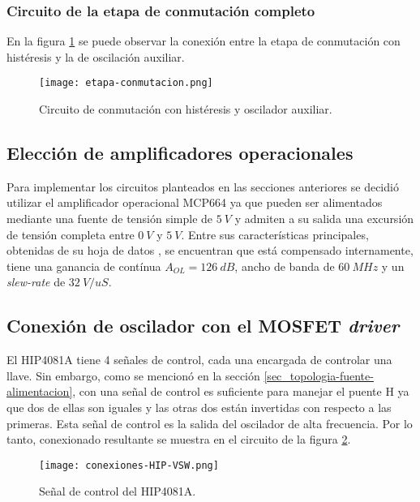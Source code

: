 \subsubsection{Circuito de la etapa de conmutación completo}

En la figura \ref{fig:img_etapa-conmutacion} se puede observar la conexión entre la etapa de conmutación con histéresis y la de oscilación auxiliar.


\begin{figure}[H]
	\centering
	\texttt{[image: etapa-conmutacion.png]}
	\caption{Circuito de conmutación con histéresis y oscilador auxiliar.}
	\label{fig:img_etapa-conmutacion}
\end{figure}

\subsection{Elección de amplificadores operacionales}

Para implementar los circuitos planteados en las secciones anteriores se decidió utilizar el amplificador operacional MCP664 ya que pueden ser alimentados mediante una fuente de tensión simple de $5\:V$ y admiten a su salida una excursión de tensión completa entre $0\:V$ y $5\:V$. Entre sus características principales, obtenidas de su hoja de datos \cite{MCP660}, se encuentran que está compensado internamente, tiene una ganancia de contínua $A_{OL}=126\:dB$, ancho de banda de $60\:MHz$ y un \textsl{slew-rate} de $32\:V/uS$.

\subsection{Conexión de oscilador con el MOSFET \textsl{driver}}
El HIP4081A tiene 4 señales de control, cada una encargada de controlar una llave. Sin embargo, como se mencionó en la sección \ref{sec_topologia-fuente-alimentacion}, con una señal de control es suficiente para manejar el puente H ya que dos de ellas son iguales y las otras dos están invertidas con respecto a las primeras. Esta señal de control es la salida del oscilador de alta frecuencia. Por lo tanto, conexionado resultante se muestra en el circuito de la figura \ref{fig:img_control-HIP}.

\begin{figure}[H]
	\centering
	\texttt{[image: conexiones-HIP-VSW.png]}
	\caption{Señal de control del HIP4081A.}
	\label{fig:img_control-HIP}
\end{figure}

